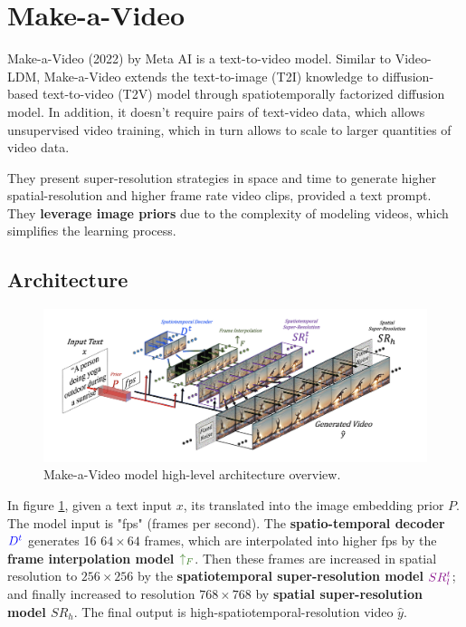 \section{Make-a-Video}
\label{sec:make_a_video}

Make-a-Video \cite{make_a_video} (2022) by Meta AI is a text-to-video model. Similar to Video-LDM, Make-a-Video extends the text-to-image (T2I) knowledge to diffusion-based text-to-video (T2V) model through spatiotemporally factorized diffusion model. In addition, it doesn't require pairs of text-video data, which allows unsupervised video training, which in turn allows to scale to larger quantities of video data.

They present super-resolution strategies in space and time to generate higher spatial-resolution and higher frame rate video clips, provided a text prompt. They \textbf{leverage image priors} due to the complexity of modeling videos, which simplifies the learning process.







\subsection{Architecture}

\begin{figure}
    \centering
    \includegraphics[width=1\textwidth]{images/make_a_video/overview.png}
    \caption{Make-a-Video model high-level architecture overview.}
    \label{fig:make_a_video_overview}
\end{figure}

In figure \ref{fig:make_a_video_overview}, given a text input $x$, its translated into the image embedding prior $P$. The model input is "fps" (frames per second). The \textbf{spatio-temporal decoder $\textcolor{blue}{D^t}$} generates 16 $64\times 64$ frames, which are interpolated into higher fps by the \textbf{frame interpolation model $\textcolor{OliveGreen}{\uparrow_F}$}. Then these frames are increased in spatial resolution to $256\times 256$ by the \textbf{spatiotemporal super-resolution model $\textcolor{Plum}{SR_l^t}$}; and finally increased to resolution $768\times 768$ by \textbf{spatial super-resolution model $SR_h$}. The final output is high-spatiotemporal-resolution video $\hat{y}$.

